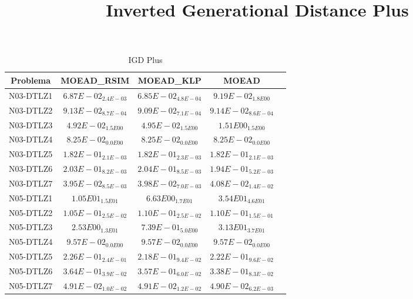\documentclass{article}
\title{Inverted Generational Distance Plus}
\author{}
\begin{document}
\maketitle
\begin{table*}[ht!]
\scriptsize
\caption{IGD Plus}
\centering\begin{tabular}{|c||c||c||c||c|} \hline
Problema &MOEAD_RSIM &MOEAD_KLP &MOEAD\\\hline
N03-DTLZ1 &\cellcolor{gray25}$6.87E-02_{2.4E-03}$ &\cellcolor{gray95}$6.85E-02_{4.8E-04}$ &$9.19E-02_{1.8E00}$\\ 
\hline
N03-DTLZ2 &\cellcolor{gray25}$9.13E-02_{8.7E-04}$ &\cellcolor{gray95}$9.09E-02_{7.1E-04}$ &$9.14E-02_{8.6E-04}$\\ 
\hline
N03-DTLZ3 &\cellcolor{gray95}$4.92E-02_{1.5E00}$ &\cellcolor{gray25}$4.95E-02_{1.5E00}$ &$1.51E00_{1.5E00}$\\ 
\hline
N03-DTLZ4 &\cellcolor{gray95}$8.25E-02_{0.0E00}$ &\cellcolor{gray25}$8.25E-02_{0.0E00}$ &$8.25E-02_{0.0E00}$\\ 
\hline
N03-DTLZ5 &\cellcolor{gray25}$1.82E-01_{2.1E-03}$ &\cellcolor{gray95}$1.82E-01_{2.3E-03}$ &$1.82E-01_{2.1E-03}$\\ 
\hline
N03-DTLZ6 &\cellcolor{gray25}$2.03E-01_{8.2E-03}$ &$2.04E-01_{8.5E-03}$ &\cellcolor{gray95}$1.94E-01_{5.2E-03}$\\ 
\hline
N03-DTLZ7 &\cellcolor{gray95}$3.95E-02_{8.5E-03}$ &\cellcolor{gray25}$3.98E-02_{7.0E-03}$ &$4.08E-02_{1.4E-02}$\\ 
\hline
N05-DTLZ1 &\cellcolor{gray25}$1.05E01_{1.5E01}$ &\cellcolor{gray95}$6.63E00_{1.7E01}$ &$3.54E01_{4.6E01}$\\ 
\hline
N05-DTLZ2 &\cellcolor{gray95}$1.05E-01_{2.5E-02}$ &\cellcolor{gray25}$1.10E-01_{2.5E-02}$ &$1.10E-01_{1.5E-01}$\\ 
\hline
N05-DTLZ3 &\cellcolor{gray25}$2.53E00_{1.3E01}$ &\cellcolor{gray95}$7.39E-01_{5.0E00}$ &$3.13E01_{3.7E01}$\\ 
\hline
N05-DTLZ4 &\cellcolor{gray95}$9.57E-02_{0.0E00}$ &\cellcolor{gray25}$9.57E-02_{0.0E00}$ &$9.57E-02_{0.0E00}$\\ 
\hline
N05-DTLZ5 &$2.26E-01_{2.4E-01}$ &\cellcolor{gray95}$2.18E-01_{9.4E-02}$ &\cellcolor{gray25}$2.22E-01_{9.6E-02}$\\ 
\hline
N05-DTLZ6 &$3.64E-01_{3.9E-02}$ &\cellcolor{gray25}$3.57E-01_{6.0E-02}$ &\cellcolor{gray95}$3.38E-01_{8.3E-02}$\\ 
\hline
N05-DTLZ7 &$4.91E-02_{1.0E-02}$ &\cellcolor{gray25}$4.91E-02_{1.2E-02}$ &\cellcolor{gray95}$4.90E-02_{6.2E-03}$\\ 

\end{tabular}
\end{table*}
\end{document}
